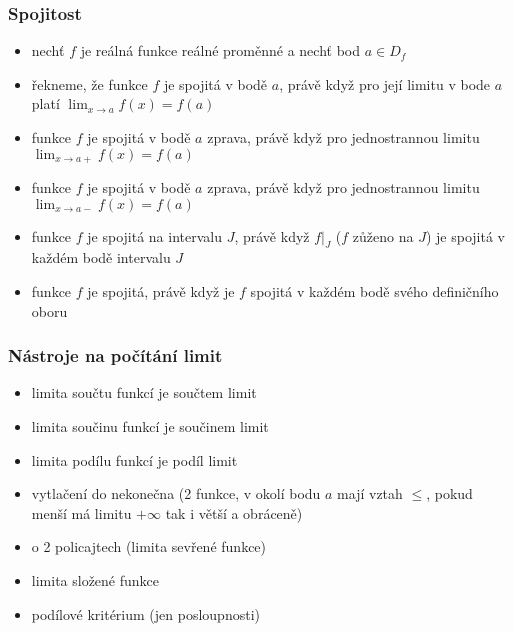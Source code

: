\subsubsection*{Spojitost}
\begin{itemize}
	\item nechť $f$ je reálná funkce reálné proměnné a nechť bod $a \in D_f$
	\item řekneme, že funkce $f$ je spojitá v bodě $ a$, právě když pro její limitu v bode $a$ platí $\lim_{x\to a} f(x) = f(a)$
	\item funkce $f$ je spojitá v bodě $a$ zprava, právě když pro jednostrannou limitu $\lim_{x\to a+} f(x) = f(a)$
	\item funkce $f$ je spojitá v bodě $a$ zprava, právě když pro jednostrannou limitu $\lim_{x\to a-} f(x) = f(a)$
	\item funkce $f$ je spojitá na intervalu $J$, právě když $f|_J$ ($f$ zůženo na $J$) je spojitá v každém bodě intervalu $J$
	\item funkce $f$ je spojitá, právě když je $f$ spojitá v každém bodě svého definičního oboru
\end{itemize}

\subsubsection*{Nástroje na počítání limit}
\begin{itemize}
	\item limita součtu funkcí je součtem limit
	\item limita součinu funkcí je součinem limit
	\item limita podílu funkcí je podíl limit
	\item vytlačení do nekonečna (2 funkce, v okolí bodu $a$ mají vztah $\leq$, pokud menší má limitu $+\infty$ tak i větší a obráceně)
	\item o 2 policajtech (limita sevřené funkce)
	\item limita složené funkce 
	\item podílové kritérium (jen posloupnosti)
\end{itemize}